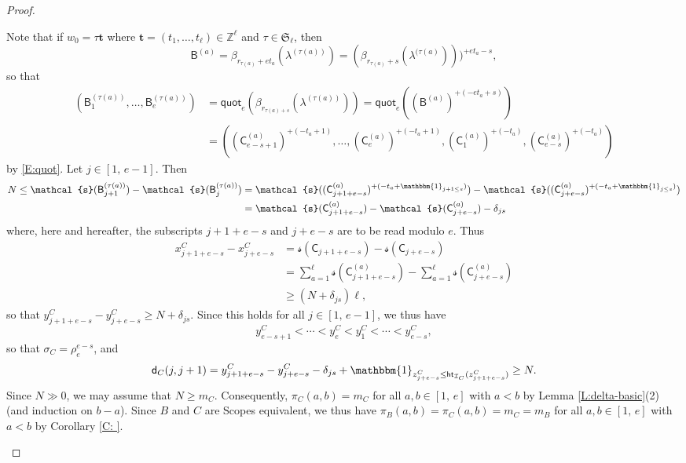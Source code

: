 \documentclass[11pt,a4paper,reqno]{amsart}
\numberwithin{equation}{section}
\theoremstyle{plain}
\theoremstyle{definition}
\theoremstyle{remark}
\numberwithin{equation}{section}
\newcommand{\bbone}{\mathbbm{1}}
\newcommand{\fs}{\mathcal{s}}
\newcommand{\bt}{\mathbf{t}}
\newcommand{\quot}{\mathsf{quot}}
\newcommand{\ZZ}{\mathbb{Z}}
\newcommand{\B}{\mathsf{B}}
\newcommand{\C}{\mathsf{C}}
\newcommand{\rr}{\rho}
\newcommand{\sym}[1]{\mathfrak{S}_{#1}}
\newcommand{\Ht}{\mathsf{ht}}
\newcommand{\II}{\mathcal{I}}
\newcommand{\dd}{\mathsf{d}}
\begin{document}
\begin{proof}
\begin{description}
Note that if $w_0 = \tau\bt $ where $\bt = (t_1,\dotsc, t_{\ell}) \in \ZZ^{\ell}$ and $\tau \in \sym{\ell}$, then
$$\B^{(a)} = \beta_{r_{\tau(a)} + et_{a}}(\lambda^{(\tau(a))}) = (\beta_{r_{\tau(a)}+s}(\lambda^{(\tau(a)})))^{+et_a-s},$$
so that
\begin{align*}
(\B^{(\tau(a))}_1, \dotsc, \B^{(\tau(a))}_e) &= \quot_e(\beta_{r_{\tau(a)+s}}(\lambda^{(\tau(a))}))
= \quot_e((\B^{(a)})^{+(-et_a+s)}) \\
&= ((\C^{(a)}_{e-s+1})^{+(-t_a+1)}, \dotsc, (\C^{(a)}_{e})^{+(-t_a+1)},
(\C^{(a)}_{1})^{+(-t_a)}, (\C^{(a)}_{e-s})^{+(-t_a)})
\end{align*}
by \eqref{E:quot}.
Let $j \in [1,\, e-1]$.  Then 
\begin{align*}
N \leq \fs(\B^{(\tau(a))}_{j+1}) - \fs(\B^{(\tau(a))}_{j})
&= \fs((\C^{(a)}_{j+1+e-s})^{+(-t_a + \bbone_{j+1 \leq s})}) -  \fs((\C^{(a)}_{j+e-s})^{+(-t_a + \bbone_{j \leq s})}) \\
&= \fs(\C^{(a)}_{j+1+e-s}) - \fs(\C^{(a)}_{j+e-s}) - \delta_{js}
\end{align*}
where, here and hereafter, the subscripts $j+1+e-s$ and $j+e-s$ are to be read modulo $e$.  %
Thus
\begin{align*}
x^C_{j+1+e-s} - x^C_{j+e-s} &= \fs(\C_{j+1+e-s}) - \fs(\C_{j+e-s}) \\
&= \sum_{a=1}^{\ell} \fs(\C^{(a)}_{j+1+e-s}) - \sum_{a=1}^{\ell} \fs(\C^{(a)}_{j+e-s}) \\
&\geq (N+\delta_{js})\ell,
\end{align*}
so that $y^C_{j+1+e-s} - y^C_{j+e-s} \geq N+ \delta_{js}$.
Since this holds for all $j \in [1,\, e-1]$, we thus have 
$$
y^C_{e-s+1} < \dotsb < y^C_e < y^C_1 < \dotsb < y^C_{e-s},
$$
so that 
$\sigma_C = \rr_e^{e-s}$, and
$$
\dd_C(j,j+1) = y^C_{j+1+e-s} - y^C_{j+e-s} - \delta_{js} + \bbone_{z^C_{j+e-s} \leq \Ht_{\II_C}(z^C_{j+1+e-s})} \geq N.
$$
Since $N \gg 0$, we may assume that $N \geq m_C$.
Consequently, $\pi_C(a,b) = m_C$ for all $a,b \in [1,\,e]$ with $a< b$ by Lemma \ref{L:delta-basic}(2) (and induction on $b-a$).
Since $B$ and $C$ are Scopes equivalent, we thus have $\pi_B(a,b) = \pi_C(a,b) = m_C = m_B$ for all $a,b \in [1,\,e]$ with $a< b$ by Corollary \ref{C: }.


\end{description}
\end{proof}
\end{document}
